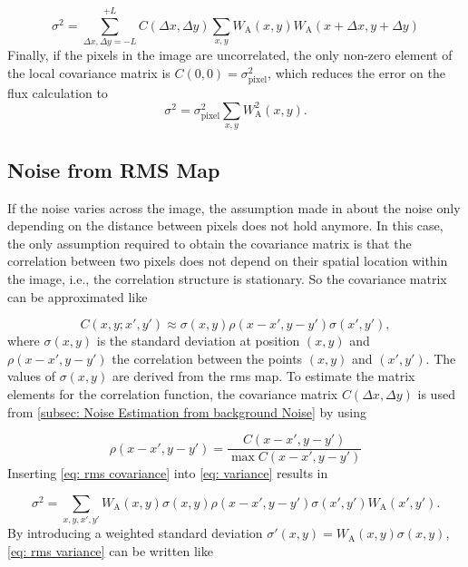 \begin{equation}\label{eq: variance correlated}
    \sigma^2 = \sum_{\Delta x, \Delta y=-L}^{+L}C(\Delta x, \Delta y)\sum_{x,y}W_\mathrm{A}(x,y)W_\mathrm{A}(x+\Delta x,y + \Delta y)
\end{equation}
Finally, if the pixels in the image are uncorrelated, the only non-zero element of the local covariance matrix is $C(0,0) = \sigma_\mathrm{pixel}^2$, which reduces the error on the flux calculation to
\begin{equation}\label{eq: variance uncorrelated}
    \sigma^2 = \sigma^2_\mathrm{pixel}\sum_{x,y}W^2_\mathrm{A}(x,y).
\end{equation}

\newpage
\subsection{Noise from RMS Map}\label{subsec: Noise from RMS}
If the noise varies across the image, the assumption made in  about the noise only depending on the distance between pixels does not hold anymore. In this case, the only assumption required to obtain the covariance matrix is that the correlation between two pixels does not depend on their spatial location within the image, i.e., the correlation structure is stationary. So the covariance matrix can be approximated like

\begin{equation}\label{eq: rms covariance}
    C(x,y;x',y') \approx \sigma(x,y)\rho(x-x',y-y')\sigma(x',y'),
\end{equation}
where $\sigma(x,y)$ is the standard deviation at position $(x,y)$ and $\rho(x-x',y-y')$ the correlation between the points $(x,y)$ and $(x',y')$. The values of $\sigma(x,y)$ are derived from the \gls{rms} map. To estimate the matrix elements for the correlation function, the covariance matrix $C(\Delta x, \Delta y)$ is used from \autoref{subsec: Noise Estimation from background Noise} by using 

\begin{equation}
    \rho(x-x',y-y')=\frac{C(x-x',y-y')}{\max C(x-x',y-y')}
\end{equation}
Inserting \autoref{eq: rms covariance} into \autoref{eq: variance} results in

\begin{equation}\label{eq: rms variance}
    \sigma^2=\sum_{x,y,x',y'}W_\mathrm{A}(x,y)\sigma(x,y)\rho(x-x',y-y')\sigma(x',y')W_\mathrm{A}(x',y').
\end{equation}
By introducing a weighted standard deviation $\sigma'(x,y)=W_\mathrm{A}(x,y)\sigma(x,y)$, \autoref{eq: rms variance} can be written like

